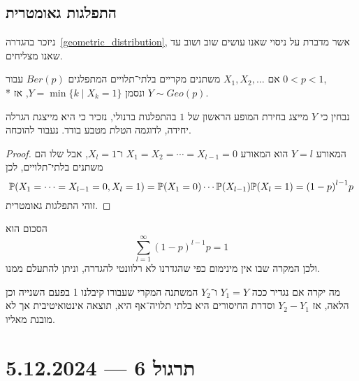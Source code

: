 \subsection{התפלגות גאומטרית}
ניזכר בהגדרה\ \ref{geometric_distribution}, אשר מדברת על ניסוי שאנו עושים שוב ושוב עד שאנו מצליחים.
\begin{proposition}
	אם $X_1, X_2, \dots$ משתנים מקריים בלתי־תלויים המתפלגים $Ber(p)$ עבור $0 < p < 1$, \\*
	ונסמן $Y = \min \{ k \mid X_k = 1 \}$, אז $Y \sim Geo(p)$.
\end{proposition}
נבחין כי $Y$ מייצג בחירת המופע הראשון של $1$ בהתפלגות ברנולי, נזכיר כי היא מייצגת הגרלה יחידה, לדוגמה הטלת מטבע בודד. נעבור להוכחה.
\begin{proof}
	המאורע $Y = l$ הוא המאורע $X_1 = X_2 = \cdots = X_{l - 1} = 0$ ו־$X_l = 1$, אבל שלו הם משתנים בלתי־תלויים, לכן
	\[
		\mathbb{P}(X_1 = \cdots = X_{l - 1} = 0, X_l = 1)
		= \mathbb{P}(X_1 = 0) \cdots \mathbb{P}(X_{l - 1}) \mathbb{P}(X_l = 1)
		= {(1 - p)}^{l - 1} p
	\]
	זוהי התפלגות גאומטרית.
\end{proof}
\begin{remark}
	הסכום הוא
	\[
		\sum_{l = 1}^{\infty} {(1 - p)}^{l - 1} p = 1
	\]
	ולכן המקרה שבו אין מינימום כפי שהגדרנו לא רלוונטי להגדרה, וניתן להתעלם ממנו.
\end{remark}
מה יקרה אם נגדיר ככה $Y_1 = Y$ ו־$Y_2$ המשתנה המקרי שעבורו קיבלנו 1 בפעם השנייה וכן הלאה, אז $Y_2 - Y_1$ וסדרת החיסורים היא בלתי תלויה־אף היא, תוצאה אינטואיטיבית אך לא מובנת מאליו.

\section{תרגול 6 --- 5.12.2024}
